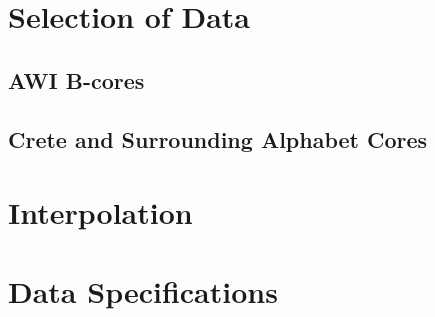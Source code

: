 \documentclass[../../CompleteThesis/Complete_1stDraft]{subfiles}
\begin{document}
\section[Selection][Selection]{Selection of Data}
\subsection[AWI B-cores]{AWI B-cores}
\subsection[Crete Area][Crete Area]{Crete and Surrounding Alphabet Cores}

\section[Interpolation][Interpolation]{Interpolation}

\section[Data Specifications][Data Specifications]{Data Specifications}
\end{document}
